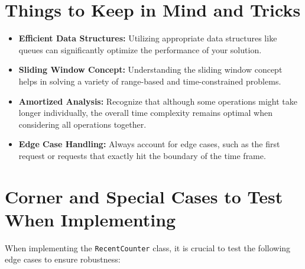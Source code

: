\section*{Things to Keep in Mind and Tricks}
\begin{itemize}
    \item \textbf{Efficient Data Structures:} Utilizing appropriate data structures like queues can significantly optimize the performance of your solution.
    
    \item \textbf{Sliding Window Concept:} Understanding the sliding window concept helps in solving a variety of range-based and time-constrained problems.
    
    \item \textbf{Amortized Analysis:} Recognize that although some operations might take longer individually, the overall time complexity remains optimal when considering all operations together.
    
    \item \textbf{Edge Case Handling:} Always account for edge cases, such as the first request or requests that exactly hit the boundary of the time frame.
\end{itemize}

\section*{Corner and Special Cases to Test When Implementing}
When implementing the \texttt{RecentCounter} class, it is crucial to test the following edge cases to ensure robustness:

